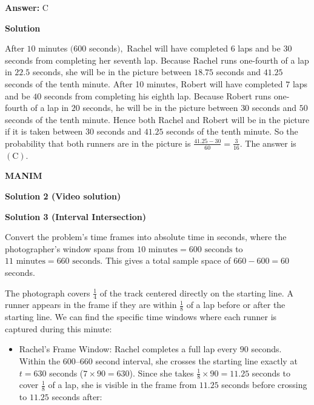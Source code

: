 \begin{enumerate}
 \textbf{Answer: }C



\textbf{Solution}

After $10$ minutes $(600$ seconds$),$ Rachel will have completed $6$ laps and be $30$ seconds from completing her seventh lap. Because Rachel runs one-fourth of a lap in $22.5$ seconds, she will be in the picture between $18.75$ seconds and $41.25$ seconds of the tenth minute.  After 10 minutes, Robert will have completed $7$ laps and be $40$ seconds from completing his eighth lap.  Because Robert runs one-fourth of a lap in $20$ seconds, he will be in the picture between $30$ seconds and $50$ seconds of the tenth minute.  Hence both Rachel and Robert will be in the picture if it is taken between $30$ seconds and $41.25$ seconds of the tenth minute.  So the probability that both runners are in the picture is $\frac {41.25 - 30} {60} = \boxed{\frac {3}{16}}$.  The answer is $\mathrm{(C)}$.

 


 


 \textbf{MANIM} 



\textbf{Solution 2 (Video solution)}






\textbf{Solution 3 (Interval Intersection)}

Convert the problem's time frames into absolute time in seconds, where the photographer's window spans from $10 \text{ minutes} = 600 \text{ seconds}$ to $11 \text{ minutes} = 660 \text{ seconds}$. This gives a total sample space of $660 - 600 = 60$ seconds.

 The photograph covers $\frac{1}{4}$ of the track centered directly on the starting line. A runner appears in the frame if they are within $\frac{1}{8}$ of a lap before or after the starting line. We can find the specific time windows where each runner is captured during this minute:


 
            \begin{itemize}
        \item Rachel's Frame Window: Rachel completes a full lap every $90$ seconds. Within the $600\text{--}660$ second interval, she crosses the starting line exactly at $t = 630$ seconds ($7 \times 90 = 630$). Since she takes $\frac{1}{8} \times 90 = 11.25$ seconds to cover $\frac{1}{8}$ of a lap, she is visible in the frame from $11.25$ seconds before crossing to $11.25$ seconds after:
            \end{itemize}
            

\end{enumerate}
